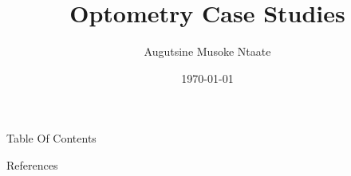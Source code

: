\documentclass[
                14pt,
                ]{beamer}
\title{Optometry Case Studies}
\author{Augutsine Musoke Ntaate}
\institute{OptoCase}
\date{\today}
\begin{document}
\begin{frame}
  \titlepage
\end{frame}

\begin{frame}[shrink=20]{Table Of Contents}

    \tiny
    \begin{multicols}{2}
    \tableofcontents
    \end{multicols}

\end{frame}



























\begin{frame}[shrink=60]{References}

    \printbibliography
    

\end{frame}


\end{document}
